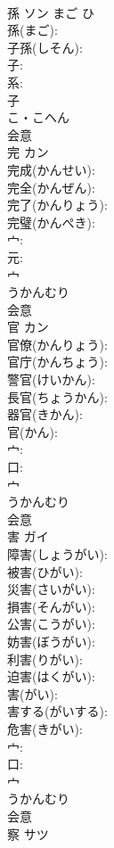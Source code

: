 \documentclass[8pt]{extreport}
\begin{document}
\begin{CJK}{UTF8}{min}
\\	孫	ソン	まご	ひ	
\\	孫(まご): 
\\	子孫(しそん): 
\\	子: 
\\	系: 
\\	子	
\\	こ・こへん	
\\	会意 
\\	完	カン			
\\	完成(かんせい): 
\\	完全(かんぜん): 
\\	完了(かんりょう): 
\\	完璧(かんぺき): 
\\	宀: 
\\	元: 
\\	宀	
\\	うかんむり	
\\	会意 
\\	官	カン			
\\	官僚(かんりょう): 
\\	官庁(かんちょう): 
\\	警官(けいかん): 
\\	長官(ちょうかん): 
\\	器官(きかん): 
\\	官(かん): 
\\	宀: 
\\	口: 
\\	宀	
\\	うかんむり	
\\	会意 
\\	害	ガイ			
\\	障害(しょうがい): 
\\	被害(ひがい): 
\\	災害(さいがい): 
\\	損害(そんがい): 
\\	公害(こうがい): 
\\	妨害(ぼうがい): 
\\	利害(りがい): 
\\	迫害(はくがい): 
\\	害(がい): 
\\	害する(がいする): 
\\	危害(きがい): 
\\	宀: 
\\	口: 
\\	宀	
\\	うかんむり	
\\	会意 
\\	察	サツ			

\end{CJK}
\end{document}
